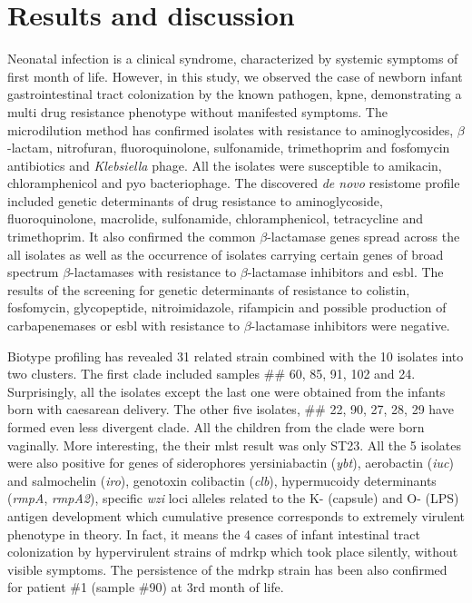 \documentclass[12pt,a4paper]{article}
\newcommand{\betalactam}{$\beta$-lactam}
\begin{document}
\section{Results and discussion}\label{sec:res_dis}
Neonatal infection is a clinical syndrome, characterized by systemic symptoms of first month of life.
However, in this study, we observed the case of newborn infant gastrointestinal tract colonization by the known
pathogen, \gls{kpne}, demonstrating a multi drug resistance phenotype without manifested symptoms.
The microdilution method has confirmed isolates with resistance to aminoglycosides, \betalactam,
nitrofuran, fluoroquinolone, sulfonamide, trimethoprim and fosfomycin antibiotics and \textit{Klebsiella} phage.
All the isolates were susceptible to amikacin, chloramphenicol and pyo bacteriophage.
The discovered \textit{de novo} resistome profile included genetic determinants of drug resistance to aminoglycoside,
fluoroquinolone, macrolide, sulfonamide, chloramphenicol, tetracycline and trimethoprim.
It also confirmed the common \betalactam ase genes spread across the all isolates as well as the occurrence of isolates
carrying certain genes of broad spectrum \betalactam ases with resistance to \betalactam ase inhibitors and \gls{esbl}.
The results of the screening for genetic determinants of resistance to colistin, fosfomycin, glycopeptide,
nitroimidazole, rifampicin and possible production of carbapenemases or \gls{esbl} with resistance to \betalactam ase
inhibitors were negative.

Biotype profiling has revealed 31 related strain combined with the 10 isolates into two clusters.
The first clade included samples \#\# 60, 85, 91, 102 and 24.
Surprisingly, all the isolates except the last one were obtained from the infants born with caesarean delivery.
The other five isolates, \#\# 22, 90, 27, 28, 29 have formed even less divergent clade.
All the children from the clade were born vaginally.
More interesting, the their \gls{mlst} result was only ST23.
All the 5 isolates were also positive for genes of siderophores yersiniabactin (\textit{ybt}),
aerobactin (\textit{iuc}) and salmochelin (\textit{iro}), genotoxin colibactin (\textit{clb}),
hypermucoidy determinants (\textit{rmpA}, \textit{rmpA2}), specific \textit{wzi} loci alleles related to the
K- (capsule) and O- (LPS) antigen development which cumulative presence corresponds to extremely virulent phenotype
in theory.
In fact, it means the 4 cases of infant intestinal tract colonization by hypervirulent strains of \gls{mdrkp} which
took place silently, without visible symptoms.
The persistence of the \gls{mdrkp} strain has been also confirmed for patient \#1 (sample \#90) at 3rd month of life.
\end{document}
